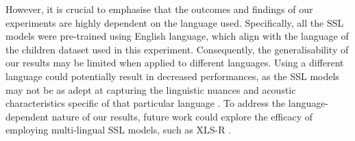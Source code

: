 However, it is crucial to emphasise that the outcomes and findings of our experiments are highly dependent on the language used. Specifically, all the \ac{SSL} models were pre-trained using English language, which align with the language of the children dataset used in this experiment. Consequently, the generalisability of our results may be limited when applied to different languages. Using a different language could potentially result in decreased performances, as the \ac{SSL} models may not be as adept at capturing the linguistic nuances and acoustic characteristics specific of that particular language \cite{phdthesis}. To address the language-dependent nature of our results, future work could explore the efficacy of employing multi-lingual \ac{SSL} models, such as XLS-R \cite{babu2021xlsr}.
